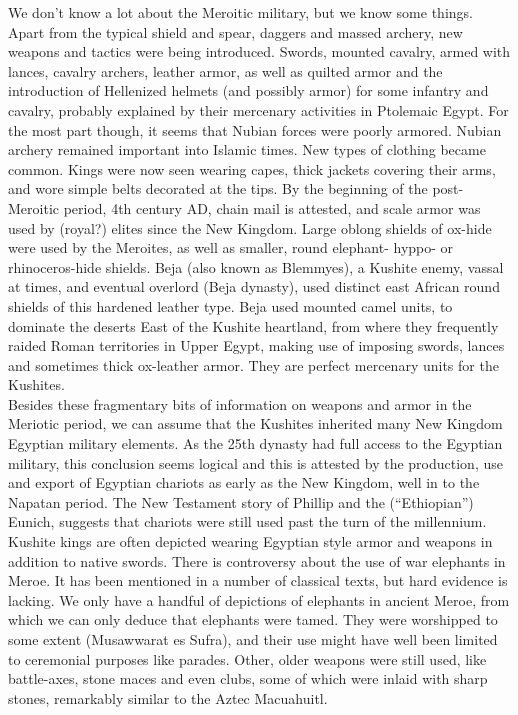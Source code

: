 \documentclass[a4paper,12pt]{scrreprt}
\begin{document}
We don’t know a lot about the Meroitic military, but we know some things. Apart from the typical shield and spear, daggers and massed archery, new weapons and tactics were being introduced. Swords, mounted cavalry, armed with lances, cavalry archers, leather armor, as well as quilted armor and the introduction of Hellenized helmets (and possibly armor) for some infantry and cavalry, probably explained by their mercenary activities in Ptolemaic Egypt. For the most part though, it seems that Nubian forces were poorly armored. Nubian archery remained important into Islamic times. New types of clothing became common. Kings were now seen wearing capes, thick jackets covering their arms, and wore simple belts decorated at the tips. By the beginning of the post-Meroitic period, 4th century AD, chain mail is attested, and scale armor was used by (royal?) elites since the New Kingdom. Large oblong shields of ox-hide were used by the Meroites, as well as smaller, round elephant- hyppo- or rhinoceros-hide shields. Beja (also known as Blemmyes), a Kushite enemy, vassal at times, and eventual overlord (Beja dynasty), used distinct east African round shields of this hardened leather type. Beja used mounted camel units, to dominate the deserts East of the Kushite heartland, from where they frequently raided Roman territories in Upper Egypt, making use of imposing swords, lances and sometimes thick ox-leather armor. They are perfect mercenary units for the Kushites.\\

 Besides these fragmentary bits of information on weapons and armor in the Meriotic period, we can assume that the Kushites inherited many New Kingdom Egyptian military elements. As the 25th dynasty had full access to the Egyptian military, this conclusion seems logical and this is attested by the production, use and export of Egyptian chariots as early as the New Kingdom, well in to the Napatan period. The New Testament story of Phillip and the (“Ethiopian”) Eunich, suggests that chariots were still used past the turn of the millennium. Kushite kings are often depicted wearing Egyptian style armor and weapons in addition to native swords. There is controversy about the use of war elephants in Meroe. It has been mentioned in a number of classical texts, but hard evidence is lacking. We only have a handful of depictions of elephants in ancient Meroe, from which we can only deduce that elephants were tamed. They were worshipped to some extent (Musawwarat es Sufra), and their use might have well been limited to ceremonial purposes like parades. Other, older weapons were still used, like battle-axes, stone maces and even clubs, some of which were inlaid with sharp stones, remarkably similar to the Aztec Macuahuitl.\\
 
\end{document}
